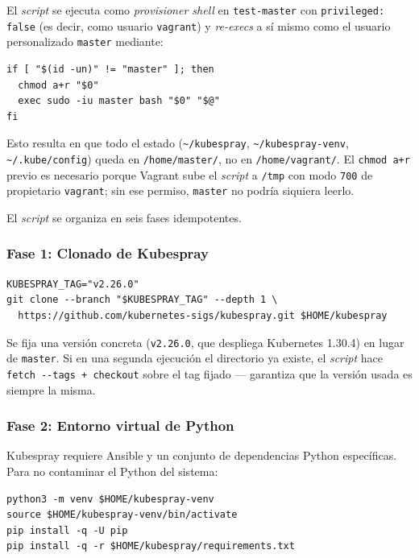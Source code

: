 El \emph{script} se ejecuta como \emph{provisioner shell} en \texttt{test-master} con \texttt{privileged: false} (es decir, como usuario \texttt{vagrant}) y \emph{re-execs} a sí mismo como el usuario personalizado \texttt{master} mediante:

\begin{lstlisting}[style=bash]
if [ "$(id -un)" != "master" ]; then
  chmod a+r "$0"
  exec sudo -iu master bash "$0" "$@"
fi
\end{lstlisting}

Esto resulta en que todo el estado (\texttt{\textasciitilde/kubespray}, \texttt{\textasciitilde/kubespray-venv}, \texttt{\textasciitilde/.kube/config}) queda en \texttt{/home/master/}, no en \texttt{/home/vagrant/}. El \texttt{chmod a+r} previo es necesario porque Vagrant sube el \emph{script} a \texttt{/tmp} con modo \texttt{700} de propietario \texttt{vagrant}; sin ese permiso, \texttt{master} no podría siquiera leerlo.

El \emph{script} se organiza en seis fases idempotentes.

\subsubsection{Fase 1: Clonado de Kubespray}

\begin{lstlisting}[style=bash]
KUBESPRAY_TAG="v2.26.0"
git clone --branch "$KUBESPRAY_TAG" --depth 1 \
  https://github.com/kubernetes-sigs/kubespray.git $HOME/kubespray
\end{lstlisting}

Se fija una versión concreta (\texttt{v2.26.0}, que despliega Kubernetes 1.30.4) en lugar de \texttt{master}. Si en una segunda ejecución el directorio ya existe, el \emph{script} hace \texttt{fetch -{}-tags + checkout} sobre el tag fijado --- garantiza que la versión usada es siempre la misma.

\subsubsection{Fase 2: Entorno virtual de Python}

Kubespray requiere Ansible y un conjunto de dependencias Python específicas. Para no contaminar el Python del sistema:

\begin{lstlisting}[style=bash]
python3 -m venv $HOME/kubespray-venv
source $HOME/kubespray-venv/bin/activate
pip install -q -U pip
pip install -q -r $HOME/kubespray/requirements.txt
\end{lstlisting}

